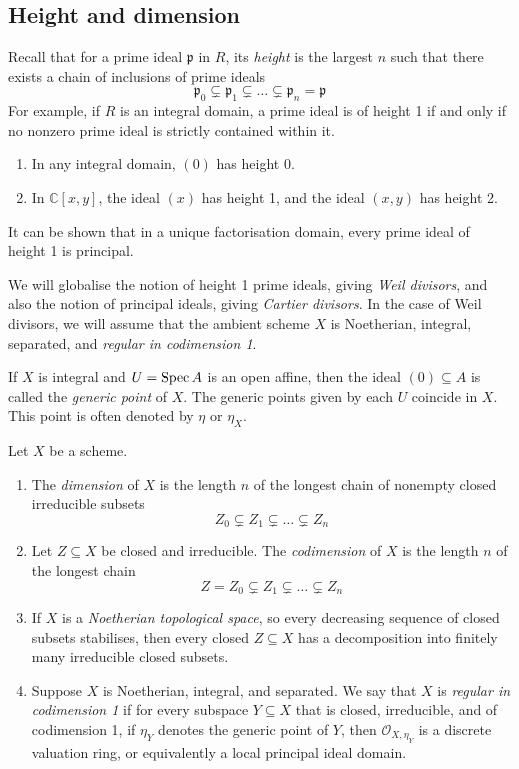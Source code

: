 \subsection{Height and dimension}
Recall that for a prime ideal \( \mathfrak p \) in \( R \), its \emph{height} is the largest \( n \) such that there exists a chain of inclusions of prime ideals
\[ \mathfrak p_0 \subsetneq \mathfrak p_1 \subsetneq \dots \subsetneq \mathfrak p_n = \mathfrak p \]
For example, if \( R \) is an integral domain, a prime ideal is of height 1 if and only if no nonzero prime ideal is strictly contained within it.
\begin{example}
    \begin{enumerate}
        \item In any integral domain, \( (0) \) has height 0.
        \item In \( \mathbb C[x, y] \), the ideal \( (x) \) has height 1, and the ideal \( (x, y) \) has height 2.
    \end{enumerate}
\end{example}
It can be shown that in a unique factorisation domain, every prime ideal of height 1 is principal.

We will globalise the notion of height 1 prime ideals, giving \emph{Weil divisors}, and also the notion of principal ideals, giving \emph{Cartier divisors}.
In the case of Weil divisors, we will assume that the ambient scheme \( X \) is Noetherian, integral, separated, and \emph{regular in codimension 1}.

If \( X \) is integral and \( U = \operatorname{Spec} A \) is an open affine, then the ideal \( (0) \subseteq A \) is called the \emph{generic point} of \( X \).
The generic points given by each \( U \) coincide in \( X \).
This point is often denoted by \( \eta \) or \( \eta_X \).
\begin{definition}
    Let \( X \) be a scheme.
    \begin{enumerate}
        \item The \emph{dimension} of \( X \) is the length \( n \) of the longest chain of nonempty closed irreducible subsets
        \[ Z_0 \subsetneq Z_1 \subsetneq \dots \subsetneq Z_n \]
        \item Let \( Z \subseteq X \) be closed and irreducible.
        The \emph{codimension} of \( X \) is the length \( n \) of the longest chain
        \[ Z = Z_0 \subsetneq Z_1 \subsetneq \dots \subsetneq Z_n \]
        \item If \( X \) is a \emph{Noetherian topological space}, so every decreasing sequence of closed subsets stabilises, then every closed \( Z \subseteq X \) has a decomposition into finitely many irreducible closed subsets.
        \item Suppose \( X \) is Noetherian, integral, and separated.
        We say that \( X \) is \emph{regular in codimension 1} if for every subspace \( Y \subseteq X \) that is closed, irreducible, and of codimension 1, if \( \eta_Y \) denotes the generic point of \( Y \), then \( \mathcal O_{X, \eta_Y} \) is a discrete valuation ring, or equivalently a local principal ideal domain.
    \end{enumerate}
\end{definition}

